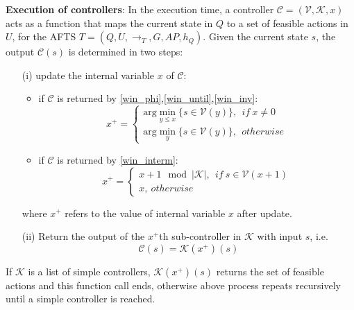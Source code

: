 \begin{definition} \textbf{Execution of controllers}:
In the execution time, a controller $ \mathcal{C}=(\mathcal{V},\mathcal{K},x) $ acts as a function that maps the current state in $ Q $ to a set of feasible actions in $ U $, for the AFTS $ T = (Q,U,\rightarrow_T, G,AP,h_Q)$. Given the current state $ s $, the output $ \mathcal{C}(s) $ is determined in two steps:
\begin{itemize}
	\item[(i)] update the internal variable $ x $ of $ \mathcal{C} $: 
	\begin{itemize}
		\item 	if $ \mathcal{C} $ is returned by \eqref{win_phi},\eqref{win_until},\eqref{win_inv}:
		\begin{displaymath}
		x^+ =	\begin{cases}
		\text{arg}\min_{y\leq x}\{s\in \mathcal{V}(y)\},\ \ if\ x\not=0\\
		\text{arg}\min_{y}\{s\in \mathcal{V}(y)\},\ \ otherwise
		\end{cases}
		\end{displaymath}
		\item  if $ \mathcal{C} $ is returned by \eqref{win_interm}:
		\begin{displaymath}
		x^+ = \begin{cases}
		x+1 \mod\vert\mathcal{K}\vert,\ \ if\ s\in \mathcal{V}(x+1)\\
		x,\ otherwise
		\end{cases}
		\end{displaymath}
	\end{itemize}
	where $ x^+ $ refers to the value of internal variable $ x $ after update.

	\item[(ii)] Return the output of the $ x^+ $th sub-controller in $ \mathcal{K} $ with input $ s $, i.e.
	\begin{displaymath}
	\mathcal{C}(s) = \mathcal{K}(x^+)(s)
	\end{displaymath}
\end{itemize}

	


	If $ \mathcal{K} $ is a list of simple controllers, $ \mathcal{K}(x^+)(s) $ returns the set of feasible actions and this function call ends, otherwise above process repeats recursively until a simple controller is reached.
	

	\label{def:exec}
\end{definition}
